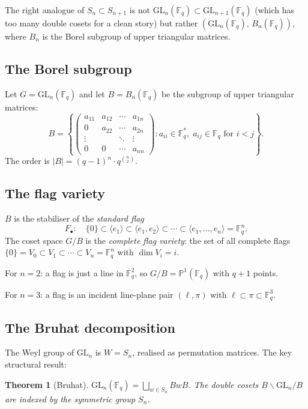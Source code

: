 \documentclass[12pt,a4paper]{article}
\newtheorem{theorem}{Theorem}[section]
\theoremstyle{definition}
\theoremstyle{remark}
\newcommand{\F}{\mathbb{F}}
\newcommand{\GL}{\mathrm{GL}}
\begin{document}
The right analogue of $S_n \subset S_{n+1}$ is not
$\GL_n(\F_q) \subset \GL_{n+1}(\F_q)$ (which has too many double
cosets for a clean story) but rather $(\GL_n(\F_q),\, B_n(\F_q))$,
where $B_n$ is the Borel subgroup of upper triangular matrices.

\subsection{The Borel subgroup}

Let $G = \GL_n(\F_q)$ and let $B = B_n(\F_q)$ be the subgroup of
upper triangular matrices:
\[
  B = \left\{\begin{pmatrix} a_{11} & a_{12} & \cdots & a_{1n} \\
  0 & a_{22} & \cdots & a_{2n} \\
  \vdots & & \ddots & \vdots \\
  0 & 0 & \cdots & a_{nn} \end{pmatrix} : a_{ii} \in \F_q^*,\;
  a_{ij} \in \F_q \text{ for } i < j\right\}.
\]
The order is $|B| = (q-1)^n \cdot q^{\binom{n}{2}}$.

\subsection{The flag variety}

$B$ is the stabiliser of the \emph{standard flag}
\[
  F_\bullet : \quad \{0\} \subset \langle e_1 \rangle \subset
  \langle e_1, e_2 \rangle \subset \cdots \subset
  \langle e_1, \ldots, e_n \rangle = \F_q^n.
\]
The coset space $G/B$ is the \emph{complete flag variety}: the set of
all complete flags $\{0\} = V_0 \subset V_1 \subset \cdots \subset
V_n = \F_q^n$ with $\dim V_i = i$.

For $n = 2$: a flag is just a line in $\F_q^2$, so $G/B =
\mathbb{P}^1(\F_q)$ with $q + 1$ points.

For $n = 3$: a flag is an incident line-plane pair $(\ell, \pi)$
with $\ell \subset \pi \subset \F_q^3$.

\subsection{The Bruhat decomposition}

The Weyl group of $\GL_n$ is $W = S_n$, realised as permutation
matrices. The key structural result:

\begin{theorem}[Bruhat]\label{thm:bruhat}
$\GL_n(\F_q) = \bigsqcup_{w \in S_n} BwB$. The double cosets
$B \backslash \GL_n / B$ are indexed by the symmetric group $S_n$.
\end{theorem}
\end{document}
